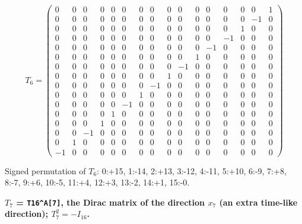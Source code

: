 \documentclass[
  10pt,
]{article}
\begin{document}
\[
T_6 = \scriptstyle \begin{pmatrix} 0 & 0 & 0 & 0 & 0 & 0 & 0 & 0 & 0 & 0 & 0 & 0 & 0 & 0 & 0 & 1 \\ 0 & 0 & 0 & 0 & 0 & 0 & 0 & 0 & 0 & 0 & 0 & 0 & 0 & 0 & -1 & 0 \\ 0 & 0 & 0 & 0 & 0 & 0 & 0 & 0 & 0 & 0 & 0 & 0 & 0 & 1 & 0 & 0 \\ 0 & 0 & 0 & 0 & 0 & 0 & 0 & 0 & 0 & 0 & 0 & 0 & -1 & 0 & 0 & 0 \\ 0 & 0 & 0 & 0 & 0 & 0 & 0 & 0 & 0 & 0 & 0 & -1 & 0 & 0 & 0 & 0 \\ 0 & 0 & 0 & 0 & 0 & 0 & 0 & 0 & 0 & 0 & 1 & 0 & 0 & 0 & 0 & 0 \\ 0 & 0 & 0 & 0 & 0 & 0 & 0 & 0 & 0 & -1 & 0 & 0 & 0 & 0 & 0 & 0 \\ 0 & 0 & 0 & 0 & 0 & 0 & 0 & 0 & 1 & 0 & 0 & 0 & 0 & 0 & 0 & 0 \\ 0 & 0 & 0 & 0 & 0 & 0 & 0 & -1 & 0 & 0 & 0 & 0 & 0 & 0 & 0 & 0 \\ 0 & 0 & 0 & 0 & 0 & 0 & 1 & 0 & 0 & 0 & 0 & 0 & 0 & 0 & 0 & 0 \\ 0 & 0 & 0 & 0 & 0 & -1 & 0 & 0 & 0 & 0 & 0 & 0 & 0 & 0 & 0 & 0 \\ 0 & 0 & 0 & 0 & 1 & 0 & 0 & 0 & 0 & 0 & 0 & 0 & 0 & 0 & 0 & 0 \\ 0 & 0 & 0 & 1 & 0 & 0 & 0 & 0 & 0 & 0 & 0 & 0 & 0 & 0 & 0 & 0 \\ 0 & 0 & -1 & 0 & 0 & 0 & 0 & 0 & 0 & 0 & 0 & 0 & 0 & 0 & 0 & 0 \\ 0 & 1 & 0 & 0 & 0 & 0 & 0 & 0 & 0 & 0 & 0 & 0 & 0 & 0 & 0 & 0 \\ -1 & 0 & 0 & 0 & 0 & 0 & 0 & 0 & 0 & 0 & 0 & 0 & 0 & 0 & 0 & 0 \end{pmatrix}
\]

Signed permutation of \(T_6\): 0:+15, 1:-14, 2:+13, 3:-12, 4:-11, 5:+10,
6:-9, 7:+8, 8:-7, 9:+6, 10:-5, 11:+4, 12:+3, 13:-2, 14:+1, 15:-0.

\textbf{\(T_7\) = \texttt{T16\^{}A{[}7{]}}, the Dirac matrix of the
direction \(x_7\) (an extra time-like direction); \(T_7^2 = -I_{16}\).}
\end{document}
